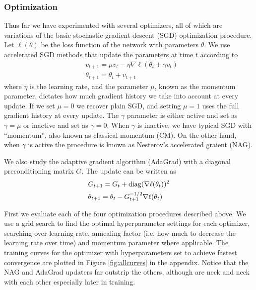 \subsubsection*{Optimization}

Thus far we have experimented with several optimizers, all of which are
variations of the basic stochastic gradient descent (SGD) optimization
procedure. Let $\ell(\theta)$ be the loss function of the network with
parameters $\theta$. We use accelerated SGD methods that update the parameters
at time $t$ according to
\begin{align*}
&v_{t+1} = \mu v_t - \eta \nabla \ell (\theta_t + \gamma v_t) \\
&\theta_{t+1} = \theta_t + v_{t+1}
\end{align*}
where $\eta$ is the learning rate, and the parameter $\mu$, known as the momentum
parameter, dictates how much gradient history we take into account at every
update. If we set $\mu = 0$ we recover plain SGD, and setting $\mu = 1$ uses
the full gradient history at every update.  The $\gamma$ parameter is either
active and set as $\gamma = \mu$ or inactive and set as $\gamma = 0$.  When
$\gamma$ is inactive, we have typical SGD with ``momentum'', also known as
classical momentum (CM). On the other hand, when $\gamma$ is active the
procedure is known as Nesterov's accelerated graient (NAG).

We also study the adaptive gradient algorithm (AdaGrad) with a diagonal
preconditioning matrix $G$. The update can be written as
\begin{align*}
&G_{t+1} = G_{t} + \operatorname*{diag}(\nabla \ell (\theta_t))^2 \\
&\theta_{t+1} = \theta_t - G_{t+1}^{-1/2} \nabla \ell(\theta_t)
\end{align*} 

First we evaluate each of the four optimization procedures described above. We
use a grid search to find the optimal hyperparameter settings for each
optimizer, searching over learning rate, annealing factor (i.e. how much to
decrease the learning rate over time) and momentum parameter where applicable.
The training curves for the optimizer with hyperparameters set to achieve
fastest convergence are plotted in Figure \ref{fig:allcurves} in the appendix. Notice that the
NAG and AdaGrad updaters far outstrip the others, although are neck and neck
with each other especially later in training.

